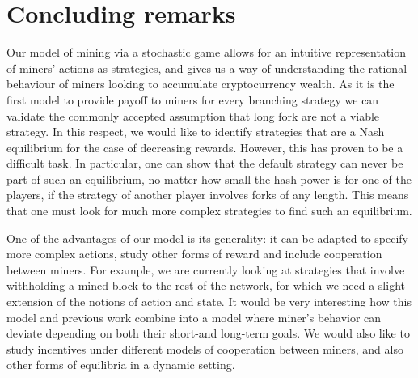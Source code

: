 \section{Concluding remarks}
\label{sec-con-r}

Our model of mining via a stochastic game allows for an intuitive representation of miners' actions as strategies, 
and gives us a way of understanding the rational behaviour of miners looking to accumulate cryptocurrency wealth. As it is the first model to provide payoff to miners for every branching strategy we can validate the commonly accepted assumption that long fork are not a viable strategy.
In this respect, we would like to identify strategies that are a Nash equilibrium for the case of decreasing rewards. However, this has proven 
to be a difficult task. In particular, one can show that the default strategy can never be part of such an 
equilibrium, no matter how small the hash power is for one of the players, if the strategy of another player involves forks of any length. 
This means that one must look for much more complex strategies to find such an equilibrium. 

One of the advantages of our model is its generality: it can be adapted to specify more complex 
actions, study other forms of reward and include cooperation between miners. For example, 
we are currently looking at strategies that involve withholding 
a mined block to the rest of the network, for which we need a slight extension of the notions of action and state. 
It would be very interesting how this model and previous work combine into a model where miner's behavior can deviate depending on both their short-and long-term 
goals. We would also like to study incentives under different models of cooperation between miners, and 
also other forms of equilibria in a dynamic setting. 

